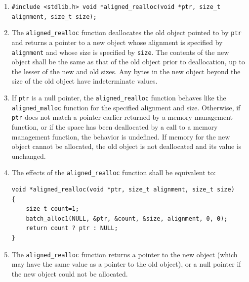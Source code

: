 \documentclass[wd]{isov2}
\begin{document}
{\color{changed}
\begin{enumerate}
\renewcommand{\theenumi}{\arabic{enumi}}
\item \texttt{\#include <stdlib.h>\linebreak
void *aligned\_realloc(void *ptr, size\_t alignment, size\_t size);}
\item The \texttt{aligned\_realloc} function deallocates the old object pointed to by \texttt{ptr} and returns a pointer to a new object whose alignment is specified by \texttt{alignment} and whose size is specified by \texttt{size}. The contents of the new object shall be the same as that of the old object prior to deallocation, up to the lesser of the new and old sizes. Any bytes in the new object beyond the size of the old object have indeterminate values.
\item If \texttt{ptr} is a null pointer, the \texttt{aligned\_realloc} function behaves like the \texttt{aligned\_malloc} function for the specified alignment and size. Otherwise, if \texttt{ptr} does not match a pointer earlier returned by a memory management function, or if the space has been deallocated by a call to a memory management function, the behavior is undefined. If memory for the new object cannot be allocated, the old object is not deallocated and its value is unchanged.
\color{changed}
\item The effects of the \texttt{aligned\_realloc} function shall be equivalent to:
\begin{verbatim}
void *aligned_realloc(void *ptr, size_t alignment, size_t size)
{
    size_t count=1;
    batch_alloc1(NULL, &ptr, &count, &size, alignment, 0, 0);
    return count ? ptr : NULL;
}
\end{verbatim}
\item The \texttt{aligned\_realloc} function returns a pointer to the new object (which may have the same value as a pointer to the old object), or a null pointer if the new object could not be allocated.
\end{enumerate}
\color{black}

}
\end{document}
